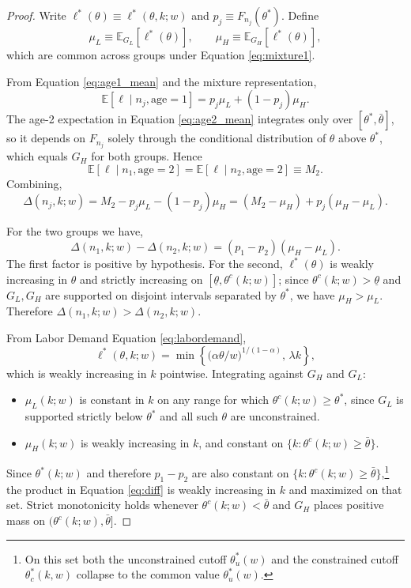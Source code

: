\begin{proof}
Write $\ell^{*}(\theta)\equiv\ell^{*}(\theta,k;w)$ and $p_{j}\equiv
F_{n_{j}}(\theta^{*})$. Define
\[
\mu_{L} \equiv \mathbb{E}_{G_{L}}[\ell^{*}(\theta)],
\qquad
\mu_{H} \equiv \mathbb{E}_{G_{H}}[\ell^{*}(\theta)],
\]
which are common across groups under Equation \eqref{eq:mixture1}.

From Equation \eqref{eq:age1_mean}
and the mixture representation,
\begin{equation}
\mathbb{E}[\ell\mid n_{j},\mathrm{age}=1]
= p_{j}\mu_{L} + (1-p_{j})\mu_{H}.
\label{eq:age1}
\end{equation}
The age-2 expectation in Equation \eqref{eq:age2_mean} integrates only over
$[\theta^{*},\bar{\theta}]$, so it depends on $F_{n_{j}}$ solely through the
conditional distribution of $\theta$ above $\theta^{*}$, which
equals $G_{H}$ for both groups. Hence
\begin{equation}
\mathbb{E}[\ell\mid n_{1},\mathrm{age}=2]
= \mathbb{E}[\ell\mid n_{2},\mathrm{age}=2] \equiv M_{2}.
\label{eq:age2-common}
\end{equation}
Combining,
\begin{equation}
\Delta(n_{j},k;w) = M_{2} - p_{j}\mu_{L} - (1-p_{j})\mu_{H}
= (M_{2}-\mu_{H}) + p_{j}(\mu_{H}-\mu_{L}).
\label{eq:delta}
\end{equation}

For the two groups we have,
\begin{equation}
\Delta(n_{1},k;w) - \Delta(n_{2},k;w)
= (p_{1}-p_{2})(\mu_{H}-\mu_{L}).
\label{eq:diff}
\end{equation}
The first factor is positive by hypothesis. For the second, $\ell^{*}(\theta)$
is weakly increasing in $\theta$ and strictly increasing on
$[\underline{\theta},\theta^{c}(k;w)]$; since
$\theta^{c}(k;w)>\underline{\theta}$ and $G_{L},G_{H}$ are supported on
disjoint intervals separated by $\theta^{*}$, we have $\mu_{H}>\mu_{L}$.
Therefore $\Delta(n_{1},k;w)>\Delta(n_{2},k;w)$.

From Labor Demand Equation \eqref{eq:labordemand},
\[
\ell^{*}(\theta,k;w) =
\min\!\left\{\bigl(\alpha\theta/w\bigr)^{1/(1-\alpha)},\,\lambda k\right\},
\]
which is weakly increasing in $k$ pointwise. Integrating against $G_{H}$ and
$G_{L}$:
\begin{itemize}\itemsep0pt
\item $\mu_{L}(k;w)$ is constant in $k$ on any range for which
$\theta^{c}(k;w)\geq\theta^{*}$, since $G_{L}$ is supported strictly below
$\theta^{*}$ and all such $\theta$ are unconstrained.
\item $\mu_{H}(k;w)$ is weakly increasing in $k$, and constant on
$\{k:\theta^{c}(k;w)\geq\bar{\theta}\}$.
\end{itemize}
Since $\theta^{*}(k;w)$ and therefore $p_{1}-p_{2}$ are also constant on
$\{k:\theta^{c}(k;w)\geq\bar{\theta}\}$,\footnote{On this set both the
unconstrained cutoff $\theta^{*}_{u}(w)$ and the constrained cutoff
$\theta^{*}_{c}(k,w)$ collapse to the common value $\theta^{*}_{u}(w)$.} the
product in Equation \eqref{eq:diff} is weakly increasing in $k$ and maximized on that
set. Strict monotonicity holds whenever $\theta^{c}(k;w)<\bar{\theta}$ and
$G_{H}$ places positive mass on $(\theta^{c}(k;w),\bar{\theta}]$.
\end{proof}